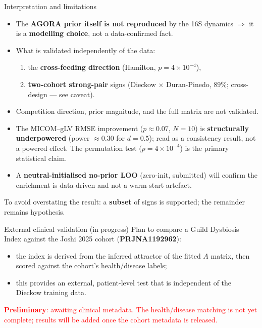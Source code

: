 \documentclass[
  ignorenonframetext,
  aspectratio=169,
]{beamer}
\providecommand{\tightlist}{%
  \setlength{\itemsep}{0pt}\setlength{\parskip}{0pt}}
\begin{document}
\begin{frame}{Interpretation and limitations}
\protect\hypertarget{interpretation-and-limitations}{}
\small

\begin{itemize}
\tightlist
\item
  The \textbf{AGORA prior itself is not reproduced} by the 16S dynamics
  \(\Rightarrow\) it is a \textbf{modelling choice}, not a
  data-confirmed fact.
\item
  What is validated independently of the data:

  \begin{enumerate}
  \tightlist
  \item
    the \textbf{cross-feeding direction} (Hamilton,
    \(p=4\times10^{-4}\)),
  \item
    \textbf{two-cohort strong-pair} signs (Dieckow \(\times\)
    Duran-Pinedo, \(89\%\); cross-design --- see caveat).
  \end{enumerate}
\item
  Competition direction, prior magnitude, and the full matrix are not
  validated.
\item
  The MICOM--gLV RMSE improvement (\(p\approx0.07\), \(N=10\)) is
  \textbf{structurally underpowered} (power \(\approx0.30\) for
  \(d=0.5\)); read as a consistency result, not a powered effect. The
  permutation test (\(p=4\times10^{-4}\)) is the primary statistical
  claim.
\item
  A \textbf{neutral-initialised no-prior LOO} (zero-init, submitted)
  will confirm the enrichment is data-driven and not a warm-start
  artefact.
\end{itemize}

\vspace{0.3em}

To avoid overstating the result: a \textbf{subset} of signs is
supported; the remainder remains hypothesis.
\end{frame}

\begin{frame}{External clinical validation (in progress)}
\protect\hypertarget{external-clinical-validation-in-progress}{}
Plan to compare a Guild Dysbiosis Index against the Joshi 2025 cohort
(\textbf{PRJNA1192962}):

\begin{itemize}
\tightlist
\item
  the index is derived from the inferred attractor of the fitted \(A\)
  matrix, then scored against the cohort's health/disease labels;
\item
  this provides an external, patient-level test that is independent of
  the Dieckow training data.
\end{itemize}

\vspace{0.4em}

\textcolor{red}{\textbf{Preliminary}: awaiting clinical metadata. The
health/disease matching is not yet complete; results will be added once the
cohort metadata is released.}
\end{frame}
\end{document}
